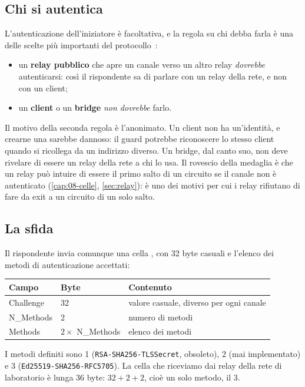 \subsection{Chi si autentica}

L'autenticazione dell'iniziatore è facoltativa, e la regola su chi debba farla è una delle scelte più importanti del protocollo~:
\begin{itemize}
  \item un \textbf{relay pubblico} che apre un canale verso un altro relay \emph{dovrebbe} autenticarsi: così il rispondente sa di parlare con un relay della rete, e non con un client;
  \item un \textbf{client} o un \textbf{bridge} \emph{non dovrebbe} farlo.
\end{itemize}
Il motivo della seconda regola è l'anonimato. Un client non ha un'identità, e crearne una sarebbe dannoso: il guard potrebbe riconoscere lo stesso client quando si ricollega da un indirizzo diverso. Un bridge, dal canto suo, non deve rivelare di essere un relay della rete a chi lo usa. Il rovescio della medaglia è che un relay può intuire di essere il primo salto di un circuito se il canale non è autenticato (\cref{cap:08-celle}, \cref{sec:relay}): è uno dei motivi per cui i relay rifiutano di fare da exit a un circuito di un solo salto.

\subsection{La sfida}

Il rispondente invia comunque una cella , con 32 byte casuali e l'elenco dei metodi di autenticazione accettati:

\begin{center}
\begin{tabular}{lll}
\toprule
Campo & Byte & Contenuto \\
\midrule
Challenge & 32 & valore casuale, diverso per ogni canale \\
N\_Methods & 2 & numero di metodi \\
Methods & $2 \times$ N\_Methods & elenco dei metodi \\
\bottomrule
\end{tabular}
\end{center}

I metodi definiti sono 1 (\texttt{RSA-SHA256-TLSSecret}, obsoleto), 2 (mai implementato) e 3 (\texttt{Ed25519-SHA256-RFC5705}). La cella che riceviamo dai relay della rete di laboratorio è lunga 36 byte: $32 + 2 + 2$, cioè un solo metodo, il 3.

